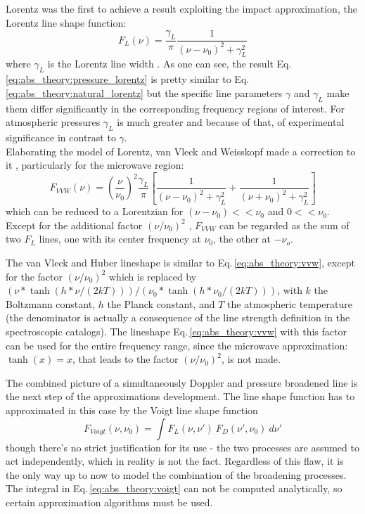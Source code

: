 Lorentz was the first to achieve a result exploiting the impact
approximation, the Lorentz line shape function:
\begin{equation}\label{eq:abs_theory:pressure_lorentz}
 F_L(\nu)=\frac{\gamma_L}{\pi}\frac{1}{(\nu-\nu_0)^2+\gamma_L^2}
\end{equation}
where $\gamma_L$ is the Lorentz line width \citep{thorne:99}. As one
can see, the result Eq.\,\ref{eq:abs_theory:pressure_lorentz} is pretty similar to
Eq.\,\ref{eq:abs_theory:natural_lorentz} but the specific line parameters $\gamma$
and $\gamma_L$ make them differ significantly in the corresponding
frequency regions of interest. For atmospheric pressures $\gamma_L$ is
much greater and because of that, of experimental
significance in contrast to $\gamma$.\\
Elaborating the model of Lorentz, van Vleck and Weisskopf made a
correction to it \citep{vanvleck:45}, particularly for the microwave
region:
\begin{equation}\label{eq:abs_theory:vvw}
 F_{VVW} (\nu)=\left(\frac{\nu}{\nu_0}\right)^2\frac{\gamma_L}{\pi}
 \left[\frac{1}{(\nu-\nu_0)^2+\gamma_L^2}+\frac{1}{(\nu+\nu_0)^2+\gamma_L^2}\right]
\end{equation}
which can be reduced to a Lorentzian for $(\nu-\nu_0) << \nu_0$ and $0
<< \nu_0$. Except for the additional factor $(\nu/\nu_0)^2$ ,
$F_{VVW}$ can be regarded as the sum of two $F_L$
lines, one with its center frequency at $\nu_0$, the other at
$-\nu_o$.

The van Vleck and Huber lineshape \citep{vanvleckhuber:77} is similar
to Eq.\,\ref{eq:abs_theory:vvw}, except for the factor $(\nu/\nu_0)^2$ which is
replaced by $(\nu * \tanh(h*\nu/(2kT)))/(\nu_0 *
\tanh(h*\nu_0/(2kT)))$, with $k$ the Boltzmann constant, $h$ the Planck
constant, and $T$ the atmospheric temperature (the denominator is
actually a consequence of the line strength definition in the
spectroscopic catalogs). The lineshape Eq.\,\ref{eq:abs_theory:vvw} with this
factor can be used for the entire frequency range, since
the microwave approximation: $\tanh(x) = x$, that leads to the factor
$(\nu/\nu_0)^2$, is not made.

The combined picture of a simultaneously Doppler and pressure
broadened line is the next step of the approximations development. The
line shape function has to approximated in this case by the Voigt line shape
function 
\begin{equation}\label{eq:abs_theory:voigt}
 F_{Voigt}(\nu,\nu_0)= \int F_L(\nu,\nu')~F_D(\nu',\nu_0)~d\nu'
\end{equation}
though there's no strict justification for its use - the two processes
are assumed to act independently, which in reality is not the
fact. Regardless of this flaw, it is the only way up to now to model
the combination of the broadening processes. The integral in Eq.\,\ref{eq:abs_theory:voigt}
can not be computed analytically, so certain approximation algorithms
must be used.


